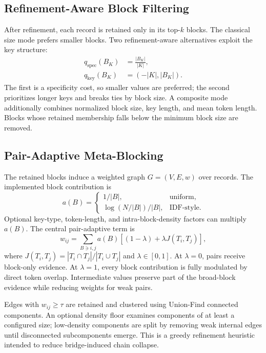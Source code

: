 \documentclass[conference]{IEEEtran}
\begin{document}
\subsection{Refinement-Aware Block Filtering}
After refinement, each record is retained only in its top-$k$ blocks. The classical size mode prefers smaller blocks. Two refinement-aware alternatives exploit the key structure:
\begin{align}
q_{\mathrm{spec}}(B_K)&=\frac{|B_K|}{|K|}, \\
q_{\mathrm{key}}(B_K)&=(-|K|,|B_K|).
\end{align}
The first is a specificity cost, so smaller values are preferred; the second prioritizes longer keys and breaks ties by block size. A composite mode additionally combines normalized block size, key length, and mean token length. Blocks whose retained membership falls below the minimum block size are removed.

\subsection{Pair-Adaptive Meta-Blocking}
The retained blocks induce a weighted graph $G=(V,E,w)$ over records. The implemented block contribution is
\begin{equation}
a(B)=
\begin{cases}
1/|B|, & \text{uniform},\\
\log(N/|B|)/|B|, & \text{IDF-style}.
\end{cases}
\end{equation}
Optional key-type, token-length, and intra-block-density factors can multiply $a(B)$. The central pair-adaptive term is
\begin{equation}
\label{eq:pairweight}
w_{ij}=\sum_{B\ni i,j} a(B)
\left[(1-\lambda)+\lambda J(T_i,T_j)\right],
\end{equation}
where $J(T_i,T_j)=|T_i\cap T_j|/|T_i\cup T_j|$ and $\lambda\in[0,1]$. At $\lambda=0$, pairs receive block-only evidence. At $\lambda=1$, every block contribution is fully modulated by direct token overlap. Intermediate values preserve part of the broad-block evidence while reducing weights for weak pairs.

Edges with $w_{ij}\geq\tau$ are retained and clustered using Union-Find connected components. An optional density floor examines components of at least a configured size; low-density components are split by removing weak internal edges until disconnected subcomponents emerge. This is a greedy refinement heuristic intended to reduce bridge-induced chain collapse.
\end{document}
